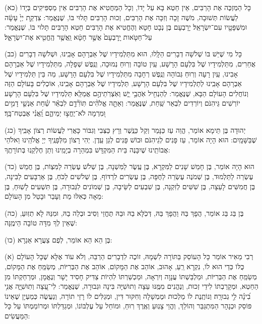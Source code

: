 \documentclass[twoside, openany, parskip=half, 11pt]{book}
\begin{document}
(כא)
כָּל הַמְזְכֶּה אֶת הָרַבִּים, אֵין חֵטְא בָּא עַל יָדוֹ, וְכָל הַמַּחֲטִיא אֶת הָרַבִּים אֵין מַסְפִּיקִים בְּיָדוֹ לַעֲשׂוֹת תְּשׁוּבָה, מֹשֶׁה זָכָה וְזִכָּה אֶת הָרַבִּים, זְכוּת הָרַבִּים תָּלוּי בּוֹ, שֶׁנֶּאֱמַר: צִדְקַ֤ת יְיָ֙ עָשָׂ֔ה וּמִשְׁפָּטָ֖יו עִם־יִשְׂרָאֵֽל׃ יָרָבְעָם בֶּן נְבָט חָטָא וְהֶחֱטִיא אֶת הָרַבִּים חֵטְא הָרַבִּים תָּלוּי בּוֹ, שֶׁנֶּאֱמַר: עַל־חַטֹּ֤אות יָֽרָבְעָם֙ אֲשֶׁ֣ר חָטָ֔א וַֽאֲשֶׁ֥ר הֶֽחֱטִ֖יא אֶת־יִשְׂרָאֵ֑ל׃

(כב)
 כָּל מִי שֶׁיֵּשׁ בּוֹ שְׁלשָׁה דְבָרִים הַלָּֽלוּ, הוּא מִתַּלְמִידָיו שֶׁל אַבְרָהָם אָבִֽינוּ, וּשְׁלשָׁה דְבָרִים אֲחֵרִים, מִתַּלְמִידָיו שֶׁל בִּלְעָם הָרָשָׁע, עַֽיִן טוֹבָה וְרֽוּחַ נְמוּכָה, וְנֶֽפֶשׁ שְׁפָלָה, מִתַּלְמִידָיו שֶׁל אַבְרָהָם אָבִינוּ, עַֽיִן רָעָה וְרֽוּחַ גְּבוֹהָה וְנֶֽפֶשׁ רְחָבָה מִתַּלְמִידָיו שֶׁל בִּלְעָם הָרָשָׁע, מַה בֵּין תַּלְמִידָיו שֶׁל אַבְרָהָם אָבִֽינוּ לְתַלְמִידָיו שֶׁל בִּלְעָם הָרָשָׁע, תַּלְמִידָיו שֶׁל אַבְרָהָם אָבִֽינוּ, אוֹכְלִים בָּעוֹלָם הַזֶּה וְנוֹחֲלִים הָעוֹלָם הַבָּא, שֶׁנֶּאֱמַר: לְהַנְחִ֖יל אֹֽהֲבַ֥י יֵ֑שׁ וְאֹֽצְרֹֽתֵיהֶ֣ם אֲמַלֵּֽא׃ תַּלְמִידָיו שֶׁל בִּלְעָם הָרָשָׁע יוֹרְשִׁים גֵּיהִנֹּם וְיוֹרְדִים לִבְאֵר שַֽׁחַת, שֶׁנֶּאֱמַר: וְאַתָּ֤ה אֱלֹהִ֨ים   תּֽוֹרִ֘דֵ֤ם לִבְאֵ֬ר שַׁ֗חַת אַנְשֵׁ֤י דָמִ֣ים וּ֭מִרְמָה לֹא־יֶחֱצ֣וּ יְמֵיהֶ֑ם וַֽ֝אֲנִ֗י אֶבְטַח־בָּֽךְ׃

(כג)
 יְהוּדָה בֶּן תֵּימָא אוֹמֵר, הֱוֵה עַז כַּנָּמֵר וְקַל כַּנֶּֽשֶׁר וְרָץ כַּצְּבִי וְגִבּוֹר כָּאֲרִי לַעֲשׂוֹת רְצוֹן אָבִֽיךָ שֶׁבַּשָּׁמָֽיִם: הוּא הָיָה אוֹמֵר, עַז פָּנִים לְגֵיהִנֹּם וּבוֹשׁ פָּנִים לְגַן עֵֽדֶן. יְהִי רָצוֹן מִלְּפָנֶֽיךָ יְיָ אֱלֹהֵֽינוּ וֵאלֹהֵי אֲבוֹתֵֽינוּ שֶׁיִבָּנֶה בֵּית הַמִּקְדָּשׁ בִּמְהֵרָה בְיָמֵֽינוּ וְתֵן חֶלְקֵֽנוּ בְּתוֹרָתֶֽךָ: 

(כד)
הוּא הָיָה אוֹמֵר, בֶּן חָמֵשׁ שָׁנִים לַמִּקְרָא, בֶּן עֶֽשֶׂר לַמִּשְׁנָה, בֶּן שְׁלֹשׁ עֶשְׂרֵה לַמִּצְוֹת, בֶּן חֲמֵשׁ עֶשְׂרֵה לַתַּלְמוּד, בֶּן שְׁמֹנֶה עֶשְׂרֵה לַחֻפָּה, בֶּן עֶשְׂרִים לִרְדּוֹף, בֶּן שְׁלשִׁים לַכֹּחַ, בֶּן אַרְבָּעִים לַבִּינָה, בֶּן חֲמִשִּׁים לָעֵצָה, בֶּן שִׁשִּׁים לְזִקְנָה, בֶּן שִׁבְעִים לְשֵּׂיבָה,  בֶּן שְׁמוֹנִים לִגְּבוּרָה, בֶּן תִּשְׁעִים לָשֽׁוּחַ, בֶּן מֵאָה כְּאִלּוּ מֵת וְעָבַר וּבָטֵל מִן הָעוֹלָם: 

(כה)
בֶּן בַּג בַּג אוֹמֵר, הֲפָךְ בַּהּ וַהֲפָךְ בַּהּ, דְּכֹֽלָּא בַהּ וּבַהּ תֶּחֱזֵי וְסִיב וּבְלֵה בַהּ, וּמִנַּהּ לָא תְזֽוּעַ, שֶׁאֵין לְךָ מִדָּה טוֹבָה הֵימֶֽנָּה: 

(כו)
 בֶּן הֵא הֵא אוֹמֵר, לְפֻם צַעֲרָא אַגְרָא: 



\kolyisroel

(א)
 רְבִי מֵאִיר אוֹמֵר כָּל הָעוֹסֵק בַּתּוֹרָה לִשְׁמָהּ, זוֹכֶה לִדְבָרִים הַרְבֵּה, וְלֹא עוֹד אֶלָּא שֶׁכָּל הָעוֹלָם כֻּלּוֹ כְּדַי הוּא לוֹ, נִקְרָא רֵֽעַ, אָהוּב, אוֹהֵב אֶת הַמָּקוֹם, אוֹהֵב אֶת הַבְּרִיּוֹת, מְשַׂמֵּֽחַ אֶת הַמָּקוֹם, מְשַׂמֵּֽחַ אֶת הַבְּרִיּוֹת, וּמַלְבַּשְׁתּוֹ עֲנָוָה וְיִרְאָה, וּמַכְשַׁרְתּוֹ לִהְיוֹת צַדִּיק חָסִיד יָשָׁר וְנֶאֱמָן, וּמְרַחַקְתּוֹ מִן הַחֵטְא, וּמְקָרַבְתּוֹ לִידֵי זְכוּת, וְנֶהֱנִים מִמֶּֽנּוּ עֵצָה וְתוּשִׁיָּה בִּינָה וּגְבוּרָה, שֶׁנֶּאֱמַר: לִי־עֵ֭צָה וְתֽוּשִׁיָּ֑ה אֲנִ֥י בִ֝ינָ֗ה לִ֣י גְבוּרָֽה׃ וְנוֹתֶֽנֶת לוֹ מַלְכוּת וּמֶמְשָׁלָה וְחִקּוּר דִּין, וּמְגַלִּים לוֹ רָזֵי תוֹרָה, וְנַעֲשֶׂה כְּמַעְיָן שֶׁאֵינוֹ פּוֹסֵק וּכְנָהָר הַמִּתְגַּבֵּר וְהוֹלֵךְ, וְהֱוֵי צָנֽוּעַ וְאֶֽרֶךְ רֽוּחַ, וּמוֹחֵל עַל עֶלְבּוֹנוֹ, וּמְגַדַּלְתּוֹ וּמְרוֹמַמְתּוֹ עַל כָּל הַמַּעֲשִׂים: 
\end{document}
